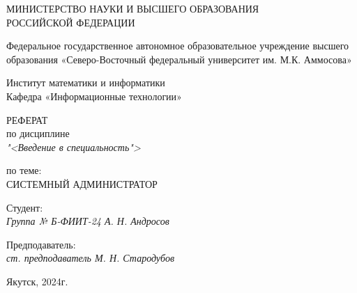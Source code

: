 \thispagestyle{empty}

\begin{center}
    МИНИСТЕРСТВО НАУКИ И ВЫСШЕГО ОБРАЗОВАНИЯ \\ РОССИЙСКОЙ ФЕДЕРАЦИИ

    \vspace{20pt}

    Федеральное государственное автономное образовательное учреждение 
    высшего образования
    «Северо-Восточный федеральный университет им. М.К. Аммосова»

    

    \vspace{20pt}

    Институт математики и информатики \\
    Кафедра «Информационные технологии»
\end{center}

\vfill

\begin{center}
    РЕФЕРАТ \\  
    по дисциплине \\
    \textit{"<Введение в специальность">}

    \vspace{20pt}

    по теме: \\
    \uppercase{Системный администратор}
\end{center}

\vfill

    \noindent Студент: \\
    \textit{Группа № Б-ФИИТ-24 \hfill А. Н. Андросов}

    \vspace{20pt}

    \noindent Предподаватель: \\
    \textit{ст. предподаватель \hfill М. Н. Стародубов}

\vfill

\begin{center}
    Якутск, 2024г.
\end{center}